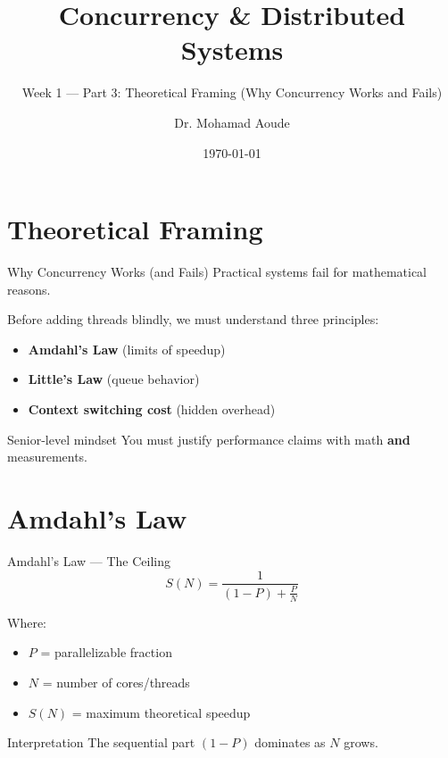\documentclass[11pt]{beamer}
\title{Concurrency \& Distributed Systems}
\subtitle{Week 1 --- Part 3: Theoretical Framing (Why Concurrency Works and Fails)}
\author{Dr. Mohamad Aoude}
\institute{Lebanese University \\ Faculty of Engineering}
\date{\today}
\begin{document}
	
	\begin{frame}
		\titlepage
	\end{frame}
	
	\section{Theoretical Framing}
	
	\begin{frame}{Why Concurrency Works (and Fails)}
		Practical systems fail for mathematical reasons.
		

		Before adding threads blindly, we must understand three principles:
		
		\begin{itemize}
			\item \textbf{Amdahl's Law} (limits of speedup)
			\item \textbf{Little's Law} (queue behavior)
			\item \textbf{Context switching cost} (hidden overhead)
		\end{itemize}
		

		\begin{alertblock}{Senior-level mindset}
			You must justify performance claims with math \textbf{and} measurements.
		\end{alertblock}
	\end{frame}
	
	\section{Amdahl's Law}
	
	\begin{frame}{Amdahl's Law --- The Ceiling}
		\[
		S(N) = \frac{1}{(1 - P) + \frac{P}{N}}
		\]
		

		Where:
		\begin{itemize}
			\item $P$ = parallelizable fraction
			\item $N$ = number of cores/threads
			\item $S(N)$ = maximum theoretical speedup
		\end{itemize}
		

		\begin{block}{Interpretation}
			The sequential part $(1-P)$ dominates as $N$ grows.
		\end{block}
	\end{frame}
	
\end{document}
